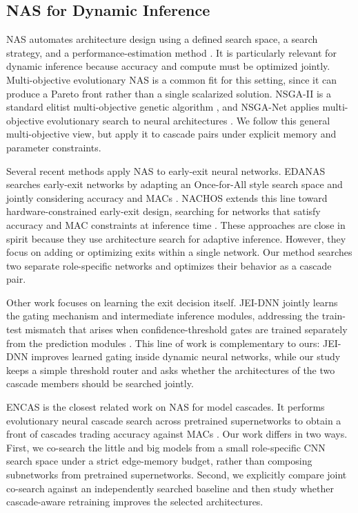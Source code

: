 \documentclass[conference]{IEEEtran}
\begin{document}
\subsection{NAS for Dynamic Inference}
\label{sec:related:nasdynamic}

NAS automates architecture design using a defined search space, a search
strategy, and a performance-estimation method \cite{elsken2019nassurvey}. It is
particularly relevant for dynamic inference because accuracy and compute must be
optimized jointly. Multi-objective evolutionary NAS is a common fit for this
setting, since it can produce a Pareto front rather than a single scalarized
solution. NSGA-II is a standard elitist multi-objective genetic algorithm
\cite{deb2002nsga2}, and NSGA-Net applies multi-objective evolutionary search
to neural architectures \cite{lu2019nsganet}. We follow this general
multi-objective view, but apply it to cascade pairs under explicit memory and
parameter constraints.

Several recent methods apply NAS to early-exit neural networks. EDANAS searches
early-exit networks by adapting an Once-for-All style search space and jointly
considering accuracy and MACs \cite{gambella2023edanas}. NACHOS extends this
line toward hardware-constrained early-exit design, searching for networks that
satisfy accuracy and MAC constraints at inference time
\cite{gambella2025nachos}. These approaches are close in spirit because they
use architecture search for adaptive inference. However, they focus on adding
or optimizing exits within a single network. Our method searches two separate
role-specific networks and optimizes their behavior as a cascade pair.

Other work focuses on learning the exit decision itself. JEI-DNN jointly learns
the gating mechanism and intermediate inference modules, addressing the
train-test mismatch that arises when confidence-threshold gates are trained
separately from the prediction modules \cite{regol2024jeidnn}. This line of
work is complementary to ours: JEI-DNN improves learned gating inside dynamic
neural networks, while our study keeps a simple threshold router and asks
whether the architectures of the two cascade members should be searched jointly.

ENCAS is the closest related work on NAS for model cascades. It performs
evolutionary neural cascade search across pretrained supernetworks to obtain a
front of cascades trading accuracy against MACs \cite{chebykin2022encas}. Our
work differs in two ways. First, we co-search the little and big models from a
small role-specific CNN search space under a strict edge-memory budget, rather
than composing subnetworks from pretrained supernetworks. Second, we explicitly
compare joint co-search against an independently searched baseline and then
study whether cascade-aware retraining improves the selected architectures.
\end{document}
